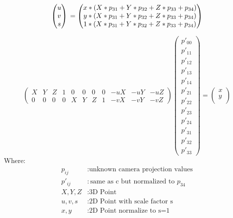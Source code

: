 \documentclass[11pt,a4paper,titlepage,oneside]{report}
\begin{document}
\begin{equation}\label{eq:projection_flat_s}
	\begin{pmatrix}u\\
		v\\
		s\\
	\end{pmatrix}\\=
	\begin{pmatrix}x*(X*p_{31}+Y*p_{32}+Z*p_{33}+p_{34})\\
		y*(X*p_{31}+Y*p_{32}+Z*p_{33}+p_{34})\\
		1*(X*p_{31}+Y*p_{32}+Z*p_{33}+p_{34})\\
	\end{pmatrix}
\end{equation}


\begin{equation}\label{eq:projection_flat_red}
	\begin{pmatrix}
		X & Y & Z & 1 & 0 & 0 & 0 & 0 & -uX & -uY & -uZ\\
		0 & 0 & 0 & 0 & X & Y & Z & 1 & -vX & -vY & -vZ
	\end{pmatrix}
	\begin{pmatrix}
		p'_{00}\\
		p'_{11}\\
		p'_{12}\\
		p'_{13}\\
		p'_{14}\\
		p'_{21}\\
		p'_{22}\\
		p'_{23}\\
		p'_{24}\\
		p'_{31}\\
		p'_{32}\\
		p'_{33}
	\end{pmatrix}=
	\begin{pmatrix}x\\
		y\\
	\end{pmatrix}
\end{equation}
Where:
\begin{align*}
	p_{ij}		&: \text{unknown camera projection values}\\
	p'_{ij}		&: \text{same as c but normalized to $p_{34}$}\\
	X,Y,Z			&: \text{3D Point}\\
	u,v,s			&: \text{2D Point with scale factor s}\\
	x,y				&: \text{2D Point normalize to s=1}\\
\end{align*}
\end{document}
